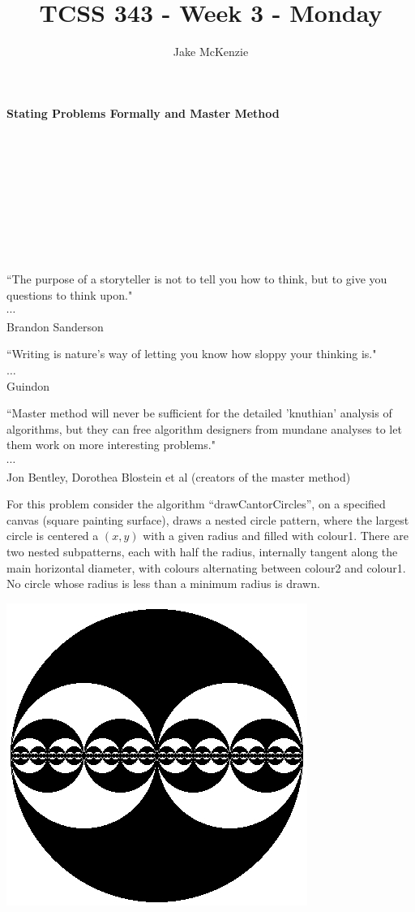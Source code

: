 \documentclass[12pt]{article}
\begin{document}
\title{TCSS 343 - Week 3 - Monday}
\author{Jake McKenzie}
\maketitle
\noindent\centerline{\textbf{Stating Problems Formally and Master Method}}\\\\\\\\\\\\\\\\
\begin{center}
    ``The purpose of a storyteller is not to tell you how to think, but to give you questions to think upon." \\$\cdots$\\ Brandon Sanderson
\end{center}
\begin{center}
    ``Writing is nature's way of letting you know how sloppy your thinking is." \\
    $\dots$\\
    Guindon
\end{center}
\begin{center}
    ``Master method will never be sufficient for the detailed 'knuthian' analysis of algorithms, but they can free algorithm designers from mundane analyses to let them work on more interesting problems." \\$\cdots$\\ Jon Bentley, Dorothea Blostein et al (creators of the master method)  
\end{center}
\newpage
\noindent For this problem consider the algorithm ``drawCantorCircles'', on a specified canvas (square painting surface), 
draws a nested circle pattern, where the largest circle is centered a $(x,y)$ with a given radius and filled with colour1. 
There are two nested subpatterns, each with half the radius, internally tangent along the main horizontal diameter, with colours 
alternating between colour2 and colour1. No circle whose radius is less than a minimum radius is drawn.
\\
\centerline{\includegraphics[scale = 2]{contor_circle.jpg}}
\end{document}
